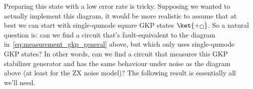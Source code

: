 Preparing this state with a low error rate is tricky.
Supposing we wanted to actually implement this diagram, it would be more realistic to assume that at best we can start with single-qumode square GKP states $\ket{+_\square}$.
So a natural question is: can we find a circuit that's fault-equivalent to the diagram in~\eqref{eq:measurement_gkp_general} above, but which only uses single-qumode GKP states?
In other words, can we find a circuit that measures this GKP stabilizer generator and has the same behaviour under noise as the diagram above (at least for the ZX noise model)?
The following result is essentially all we'll need.

